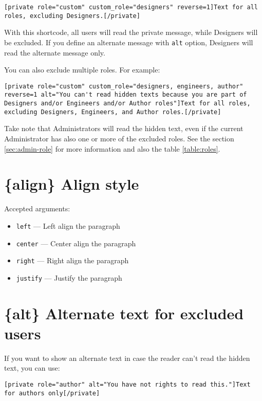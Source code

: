 \begin{lstlisting}
[private role="custom" custom_role="designers" reverse=1]Text for all roles, excluding Designers.[/private]
\end{lstlisting}

With this shortcode, all users will read the private message, while Designers
will be excluded. If you define an alternate message with \verb+alt+ option,
Designers will read the alternate message only.

You can also exclude multiple roles. For example:

\begin{lstlisting}
[private role="custom" custom_role="designers, engineers, author" reverse=1 alt="You can't read hidden texts because you are part of Designers and/or Engineers and/or Author roles"]Text for all roles, excluding Designers, Engineers, and Author roles.[/private]
\end{lstlisting}

Take note that Administrators will read the hidden text, even if the current
Administrator has also one or more of the excluded roles. See the section
\vref{sec:admin-role} for more information and also the table \vref{table:roles}.

\section{\{align\} Align style}

Accepted arguments:

\begin{itemize}
 \item \verb+left+ --- Left align the paragraph
 \item \verb+center+ --- Center align the paragraph
 \item \verb+right+ --- Right align the paragraph
 \item \verb+justify+ --- Justify the paragraph
\end{itemize}

\section{\{alt\} Alternate text for excluded users}

If you want to show an alternate text in case the reader can't read the hidden
text, you can use:

\begin{lstlisting}
[private role="author" alt="You have not rights to read this."]Text for authors only[/private]
\end{lstlisting}

